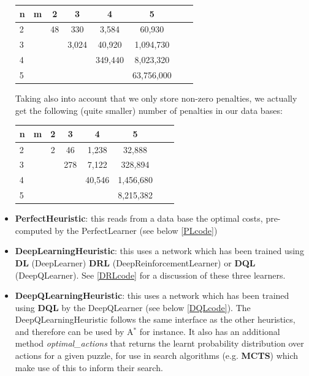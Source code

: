 \begin{itemize}
\begin{center}
\begin{tabular}{l*{6}{c}r}
n              & m & 2 & 3 & 4 & 5\\
\hline
2              &   & 48 & 330 & 3,584 & 60,930 \\
3              &   &   & 3,024  & 40,920 &  1,094,730  \\
4              &   &   &  & 349,440 & 8,023,320   \\
5              &   &   &  &  & 63,756,000   \\
\end{tabular}
\end{center}
Taking also into account that we only store non-zero penalties, we actually get the following (quite smaller) number of penalties in our data bases:
\begin{center}
\begin{tabular}{l*{6}{c}r}
n              & m & 2 & 3 & 4 & 5\\
\hline
2              &   & 2 & 46 & 1,238  & 32,888 \\
3              &   &  & 278  & 7,122 & 328,894   \\
4              &   &   &  & 40,546 &  1,456,680 \\
5              &   &   &  &  &  8,215,382 \\
\end{tabular}
\end{center}



\item \textbf{PerfectHeuristic}: this reads from a data base the optimal costs, pre-computed by the PerfectLearner (see below \ref{PLcode})
\item \textbf{DeepLearningHeuristic}: this uses a network which has been trained using \textbf{DL} (DeepLearner) \textbf{DRL} (DeepReinforcementLearner) or \textbf{DQL} (DeepQLearner). See \ref{DRLcode} for a discussion of these three learners.
\item \textbf{DeepQLearningHeuristic}: this uses a network which has been trained using \textbf{DQL} by the DeepQLearner (see below \ref{DQLcode}). The DeepQLearningHeuristic follows the same interface as the other heuristics, and therefore can be used by A$^{*}$ for instance. It also has an additional method \textit{optimal\_actions} that returns the learnt probability distribution over actions for a given puzzle, for use in search algorithms (e.g. \textbf{MCTS}) which make use of this to inform their search.
\end{itemize}



